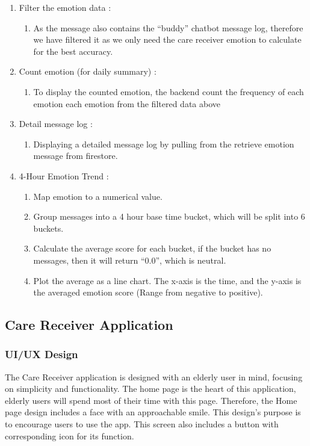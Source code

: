 \begin{enumerate}[leftmargin=2.2cm]
\begin{enumerate}[label=\arabic*.]
			\item Filter the emotion data :
				\begin{enumerate}[label=\alph*.] 
				\item As the message also contains the “buddy” chatbot message log, therefore we have filtered it as we only need the care receiver emotion to calculate for the best accuracy. 
			\end{enumerate}
		
			\item Count emotion (for daily summary) :
			\begin{enumerate}[label=\alph*.] 
				\item To display the counted emotion, the backend count the frequency of each emotion each emotion from the filtered data above 
			\end{enumerate}
		
			\item Detail message log :
			\begin{enumerate}[label=\alph*.] 
				\item Displaying a detailed message log by pulling from the retrieve emotion message from firestore.
			\end{enumerate}
		
			\item 4-Hour Emotion Trend :
			\begin{enumerate}[label=\alph*.] 
				\item Map emotion to a numerical value.
				\item Group messages into a 4 hour base time bucket, which will be split into 6 buckets.
				\item Calculate the average score for each bucket, if the bucket has no messages, then it will return “0.0”, which is neutral. 
				\item Plot the average as a line chart. The x-axis is the time, and the y-axis is the averaged emotion score (Range from negative to positive).
			\end{enumerate}
		\end{enumerate}
\end{enumerate}

\newpage
\subsection{Care Receiver Application}
\subsubsection{UI/UX Design}
{ 
	\setlength{\leftskip}{1.8cm}
	\setlength{\parindent}{5em}
	The Care Receiver application is designed with an elderly user in mind, focusing on simplicity and functionality. The home page is the heart of this application, elderly users will spend most of their time with this page. Therefore, the Home page design includes a face with an approachable smile. This design’s purpose is to encourage users to use the app. This screen also includes a button with corresponding icon for its function.
	\par
}

